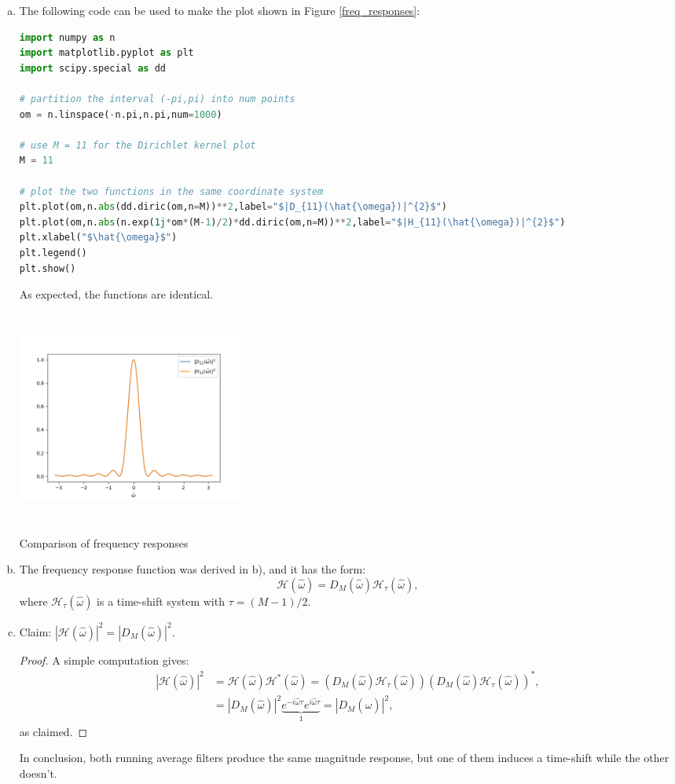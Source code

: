 \begin{enumerate}
\begin{enumerate}[a)]
\item The following code can be used to make the plot shown in Figure \ref{freq_responses}:
\begin{lstlisting}[language=Python, caption=Plotting the frequency response code,label=code14_2]
import numpy as n
import matplotlib.pyplot as plt
import scipy.special as dd

# partition the interval (-pi,pi) into num points
om = n.linspace(-n.pi,n.pi,num=1000)

# use M = 11 for the Dirichlet kernel plot
M = 11

# plot the two functions in the same coordinate system
plt.plot(om,n.abs(dd.diric(om,n=M))**2,label="$|D_{11}(\hat{\omega})|^{2}$")
plt.plot(om,n.abs(n.exp(1j*om*(M-1)/2)*dd.diric(om,n=M))**2,label="$|H_{11}(\hat{\omega})|^{2}$")
plt.xlabel("$\hat{\omega}$")
plt.legend()
plt.show()
\end{lstlisting}
As expected, the functions are identical. 
\begin{marginfigure}
    \includegraphics[height=7.0cm,width=7.5cm]{ch11/figures/frequency_responses.png}
    \caption{Comparison of frequency responses}
    \label{freq_responses}
\end{marginfigure}

\item The frequency response function was derived in b), and it has the form:
$$\mathcal{H}(\hat{\omega})=D_{M}(\hat{\omega})\mathcal{H}_{\tau}(\hat{\omega}),$$
where $\mathcal{H}_{\tau}(\hat{\omega})$ is a time-shift system with $\tau=(M-1)/2$. 

\item Claim: $|\mathcal{H}(\hat{\omega})|^{2}=|D_{M}(\hat{\omega})|^{2}$.
\begin{proof}
A simple computation gives:
\begin{align*}
    |\mathcal{H}(\hat{\omega})|^{2}&=\mathcal{H}(\hat{\omega})\mathcal{H}^{*}(\hat{\omega})=(D_{M}(\hat{\omega})\mathcal{H}_{\tau}(\hat{\omega}))(D_{M}(\hat{\omega})\mathcal{H}_{\tau}(\hat{\omega}))^{*},\\
    &=|D_{M}(\hat{\omega})|^{2}\underbrace{e^{-i\hat{\omega}\tau}e^{i\hat{\omega}\tau}}_{1}=|D_{M}(\hat{\omega})|^{2},
\end{align*}
as claimed. 
\end{proof}
In conclusion, both running average filters produce the same magnitude response, but one of them induces a time-shift while the other doesn't. 
\end{enumerate}


\end{enumerate}
